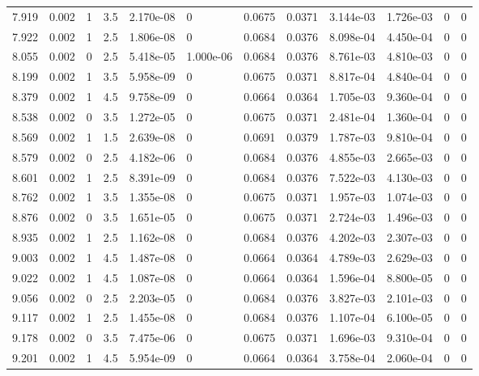 \documentclass[preview]{standalone}
\begin{document}
{{{\begin{tabular}{L{1.2cm}C{1.2cm} C{0.3cm}C{0.5cm} C{1.4cm}C{1.4cm} C{1.4cm}C{1.4cm} C{1.6cm}C{1.6cm} C{1.6cm}C{1.6cm}}
  7.919  &  0.002  & 1     & 3.5 &  2.170e-08  & 0  &  0.0675&   0.0371& 3.144e-03 & 1.726e-03   &  0 & 0  \\ 
  7.922  &  0.002  & 1     & 2.5 &  1.806e-08  & 0  &  0.0684&   0.0376& 8.098e-04 & 4.450e-04   &  0 & 0  \\ 
  8.055  &  0.002  & 0     & 2.5 &  5.418e-05  & 1.000e-06  &  0.0684&   0.0376& 8.761e-03 & 4.810e-03   &  0 & 0  \\ 
  8.199  &  0.002  & 1     & 3.5 &  5.958e-09  & 0  &  0.0675&   0.0371& 8.817e-04 & 4.840e-04   &  0 & 0  \\ 
  8.379  &  0.002  & 1     & 4.5 &  9.758e-09  & 0  &  0.0664&   0.0364& 1.705e-03 & 9.360e-04   &  0 & 0  \\ 
  8.538  &  0.002  & 0     & 3.5 &  1.272e-05  & 0  &  0.0675&   0.0371& 2.481e-04 & 1.360e-04   &  0 & 0  \\ 
  8.569  &  0.002  & 1     & 1.5 &  2.639e-08  & 0  &  0.0691&   0.0379& 1.787e-03 & 9.810e-04   &  0 & 0  \\ 
  8.579  &  0.002  & 0     & 2.5 &  4.182e-06  & 0  &  0.0684&   0.0376& 4.855e-03 & 2.665e-03   &  0 & 0  \\ 
  8.601  &  0.002  & 1     & 2.5 &  8.391e-09  & 0  &  0.0684&   0.0376& 7.522e-03 & 4.130e-03   &  0 & 0  \\ 
  8.762  &  0.002  & 1     & 3.5 &  1.355e-08  & 0  &  0.0675&   0.0371& 1.957e-03 & 1.074e-03   &  0 & 0  \\ 
  8.876  &  0.002  & 0     & 3.5 &  1.651e-05  & 0  &  0.0675&   0.0371& 2.724e-03 & 1.496e-03   &  0 & 0  \\ 
  8.935  &  0.002  & 1     & 2.5 &  1.162e-08  & 0  &  0.0684&   0.0376& 4.202e-03 & 2.307e-03   &  0 & 0  \\ 
  9.003  &  0.002  & 1     & 4.5 &  1.487e-08  & 0  &  0.0664&   0.0364& 4.789e-03 & 2.629e-03   &  0 & 0  \\ 
  9.022  &  0.002  & 1     & 4.5 &  1.087e-08  & 0  &  0.0664&   0.0364& 1.596e-04 & 8.800e-05   &  0 & 0  \\ 
  9.056  &  0.002  & 0     & 2.5 &  2.203e-05  & 0  &  0.0684&   0.0376& 3.827e-03 & 2.101e-03   &  0 & 0  \\ 
  9.117  &  0.002  & 1     & 2.5 &  1.455e-08  & 0  &  0.0684&   0.0376& 1.107e-04 & 6.100e-05   &  0 & 0  \\ 
  9.178  &  0.002  & 0     & 3.5 &  7.475e-06  & 0  &  0.0675&   0.0371& 1.696e-03 & 9.310e-04   &  0 & 0  \\ 
  9.201  &  0.002  & 1     & 4.5 &  5.954e-09  & 0  &  0.0664&   0.0364& 3.758e-04 & 2.060e-04   &  0 & 0  \\ 

\end{tabular}}}}
\end{document}
